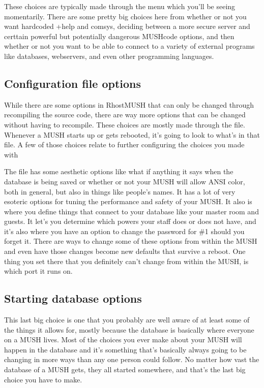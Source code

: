 \documentclass[letterpaper,10pt,english]{sphinxmanual}
\begin{document}
\sphinxAtStartPar
These choices are typically made through the  menu which you’ll
be seeing momentarily. There are some pretty big choices here from whether or
not you want hardcoded +help and comsys, deciding between a more secure server
and certtain powerful but potentially dangerous MUSHcode options, and then
whether or not you want to be able to connect to a variety of external programs
like databases, webservers, and even other programming languages.


\subsection{Configuration file options}
\label{\detokenize{install:configuration-file-options}}
\sphinxAtStartPar
While there are some options in RhostMUSH that can only be changed through
recompiling the source code, there are way more options that can be changed
without having to recompile. These choices are mostly made through the
 file. Whenever a MUSH starts up or gets rebooted, it’s
going to look to what’s in that file. A few of those choices relate to
further configuring the choices you made with 

\sphinxAtStartPar
The  file has some aesthetic options like what if anything
it says when the database is being saved or whether or not your MUSH will
allow ANSI color, both in general, but also in things like people’s names.
It has a lot of very esoteric options for tuning the performance and safety
of your MUSH. It also is where you define things that connect to your database
like your master room and guests. It let’s you determine which powers your
staff does or does not have, and it’s also where you have an option to change
the password for \#1 should you forget it. There are ways to change some of
these options from within the MUSH and even have those changes become new
defaults that survive a reboot. One thing you set there that you definitely
can’t change from within the MUSH, is which port it runs on.


\subsection{Starting database options}
\label{\detokenize{install:starting-database-options}}
\sphinxAtStartPar
This last big choice is one that you probably are well aware of at least some
of the things it allows for, mostly because the database is basically where
everyone on a MUSH lives. Most of the choices you ever make about your MUSH
will happen in the database and it’s something that’s basically always going
to be changing in more ways than any one person could follow. No matter how
vast the database of a MUSH gets, they all started somewhere, and that’s the
last big choice you have to make.
\end{document}
